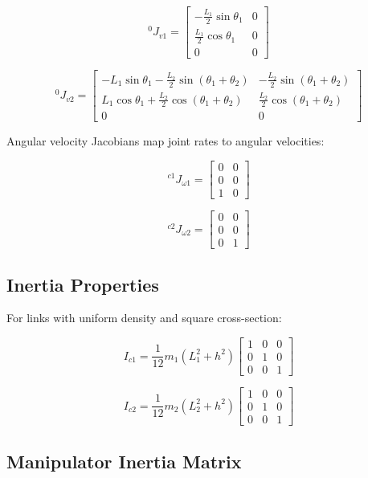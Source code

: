 \documentclass{article}
\begin{document}
\[
{}^0 J_{v1} = \begin{bmatrix} 
-\frac{L_1}{2} \sin\theta_1 & 0 \\ 
\frac{L_1}{2} \cos\theta_1 & 0 \\ 
0 & 0 
\end{bmatrix}
\]

\[
{}^0 J_{v2} = \begin{bmatrix} 
-L_1 \sin\theta_1 - \frac{L_2}{2} \sin(\theta_1 + \theta_2) & -\frac{L_2}{2} \sin(\theta_1 + \theta_2) \\ 
L_1 \cos\theta_1 + \frac{L_2}{2} \cos(\theta_1 + \theta_2) & \frac{L_2}{2} \cos(\theta_1 + \theta_2) \\ 
0 & 0 
\end{bmatrix}
\]

Angular velocity Jacobians map joint rates to angular velocities:

\[
{}^{c1} J_{\omega 1} = \begin{bmatrix} 
0 & 0 \\ 
0 & 0 \\ 
1 & 0 
\end{bmatrix}
\]

\[
{}^{c2} J_{\omega 2} = \begin{bmatrix} 
0 & 0 \\ 
0 & 0 \\ 
0 & 1 
\end{bmatrix}
\]

\subsection*{Inertia Properties}

For links with uniform density and square cross-section:

\[
I_{c1} = \frac{1}{12}m_1(L_1^2 + h^2) \begin{bmatrix} 
1 & 0 & 0 \\ 
0 & 1 & 0 \\ 
0 & 0 & 1
\end{bmatrix}
\]

\[
I_{c2} = \frac{1}{12}m_2(L_2^2 + h^2) \begin{bmatrix} 
1 & 0 & 0 \\ 
0 & 1 & 0 \\ 
0 & 0 & 1
\end{bmatrix}
\]

\subsection*{Manipulator Inertia Matrix}
\end{document}

